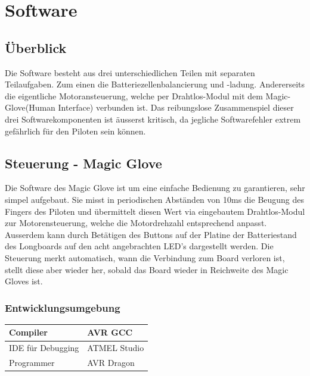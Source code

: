 \chapter{Software} \label{Software}
\section{Überblick}
Die Software besteht aus drei unterschiedlichen Teilen mit separaten Teilaufgaben. Zum einen die Batteriezellenbalancierung und -ladung. Andererseits die eigentliche Motoransteuerung, welche per Drahtlos-Modul mit dem Magic-Glove(Human Interface) verbunden ist. Das reibungslose Zusammenspiel dieser drei Softwarekomponenten ist äusserst kritisch, da jegliche Softwarefehler extrem gefährlich für den Piloten sein können.
\section{Steuerung - Magic Glove} \label{SW_MagicGlove}
Die Software des Magic Glove ist um eine einfache Bedienung zu garantieren, sehr simpel aufgebaut. Sie misst in periodischen Abständen von 10ms die Beugung des Fingers des Piloten und übermittelt diesen Wert via eingebautem Drahtlos-Modul zur Motorensteuerung, welche die Motordrehzahl entsprechend anpasst. Ausserdem kann durch Betätigen des Buttons auf der Platine der Batteriestand des Longboards auf den acht angebrachten LED's dargestellt werden. Die Steuerung merkt automatisch, wann die Verbindung zum Board verloren ist, stellt diese aber wieder her, sobald das Board wieder in Reichweite des Magic Gloves ist.\\
\subsection*{Entwicklungsumgebung}
\begin{center}
	\begin{tabular}{ | l | l | }
		\hline
		Compiler & AVR GCC \\ \hline
		IDE für Debugging & ATMEL Studio \\ \hline
		Programmer & AVR Dragon \\ \hline
	\end{tabular}
\end{center}
